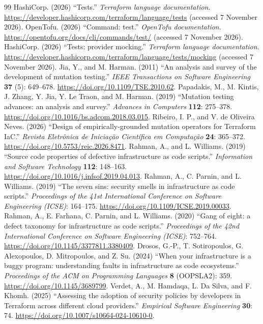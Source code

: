 \begin{thebibliography}{99}
 HashiCorp. (2026) ``Tests.'' \textit{Terraform language documentation}. \url{https://developer.hashicorp.com/terraform/language/tests} (accessed 7 November 2026).
 OpenTofu. (2026) ``Command: test.'' \textit{OpenTofu documentation}. \url{https://opentofu.org/docs/cli/commands/test/} (accessed 7 November 2026).
 HashiCorp. (2026) ``Tests: provider mocking.'' \textit{Terraform language documentation}. \url{https://developer.hashicorp.com/terraform/language/tests/mocking} (accessed 7 November 2026).
 Jia, Y., and M. Harman. (2011) ``An analysis and survey of the development of mutation testing.'' \textit{IEEE Transactions on Software Engineering} \textbf{37} (5): 649--678. \url{https://doi.org/10.1109/TSE.2010.62}.
 Papadakis, M., M. Kintis, J. Zhang, Y. Jia, Y. Le Traon, and M. Harman. (2019) ``Mutation testing advances: an analysis and survey.'' \textit{Advances in Computers} \textbf{112}: 275--378. \url{https://doi.org/10.1016/bs.adcom.2018.03.015}.
 Ribeiro, I. P., and V. de Oliveira Neves. (2026) ``Design of empirically-grounded mutation operators for Terraform IaC.'' \textit{Revista Eletr\^onica de Inicia\c{c}\~ao Cient\'{i}fica em Computa\c{c}\~ao} \textbf{24}: 365--372. \url{https://doi.org/10.5753/reic.2026.8471}.
 Rahman, A., and L. Williams. (2019) ``Source code properties of defective infrastructure as code scripts.'' \textit{Information and Software Technology} \textbf{112}: 148--163. \url{https://doi.org/10.1016/j.infsof.2019.04.013}.
 Rahman, A., C. Parnin, and L. Williams. (2019) ``The seven sins: security smells in infrastructure as code scripts.'' \textit{Proceedings of the 41st International Conference on Software Engineering (ICSE)}: 164--175. \url{https://doi.org/10.1109/ICSE.2019.00033}.
 Rahman, A., E. Farhana, C. Parnin, and L. Williams. (2020) ``Gang of eight: a defect taxonomy for infrastructure as code scripts.'' \textit{Proceedings of the 42nd International Conference on Software Engineering (ICSE)}: 752--764. \url{https://doi.org/10.1145/3377811.3380409}.
 Drosos, G.-P., T. Sotiropoulos, G. Alexopoulos, D. Mitropoulos, and Z. Su. (2024) ``When your infrastructure is a buggy program: understanding faults in infrastructure as code ecosystems.'' \textit{Proceedings of the ACM on Programming Languages} \textbf{8} (OOPSLA2): 359. \url{https://doi.org/10.1145/3689799}.
 Verdet, A., M. Hamdaqa, L. Da Silva, and F. Khomh. (2025) ``Assessing the adoption of security policies by developers in Terraform across different cloud providers.'' \textit{Empirical Software Engineering} \textbf{30}: 74. \url{https://doi.org/10.1007/s10664-024-10610-0}.

\end{thebibliography}
